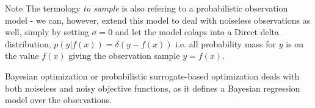 Note The termology \textit{to sample} is also refering to a probabilistic observation model - we
can, however, extend this model to deal with noiseless observations as well, simply by setting
$\sigma = 0$ and let the model colaps into a Direct delta distribution, $p(y|f(x)) =
\mathcal{\delta}(y-f(x))$ i.e. all probability mass for $y$ is on the value $f(x)$ giving the
observation sample $y = f(x)$. 

Bayesian optimization or probabilistic surrogate-based optimization deals with both noiseless and noisy objective functions,
as it defines a Bayesian regression model over the observations.

